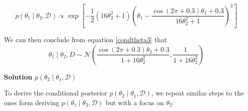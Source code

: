 \documentclass[12pt]{article}
\begin{document}
\begin{enumerate}
\begin{equation} \label{condtheta3}
p(\theta_1 \mid \theta_2, \mathcal{D}) \propto \exp\left[-\frac{1}{2}(16\theta_2^2 + 1)\left(\theta_1 - \frac{\cos(2\pi + 0.3)\theta_2 + 0.3}{16\theta_2^2 + 1}\right)^2\right]
\end{equation}

We can then conclude from equation \ref{condtheta3} that
\begin{equation}\label{condtheta4}
\theta_1 \mid \theta_2, D \sim \mathcal{N} \left( \frac{\cos(2\pi+0.3)\theta_2 + 0.3}{1 + 16\theta_2^2}, \frac{1}{1 + 16\theta_2^2} \right)
\end{equation}
\end{enumerate}



\textbf{Solution \(p(\theta_2 \mid \theta_1, \mathcal{D})\) }

To derive the conditional posterior \(p(\theta_2 \mid \theta_1, \mathcal{D})\), we repeat similar  steps to the ones form deriving  \(p(\theta_1 \mid \theta_2, \mathcal{D})\) but with a focus on $\theta_2$:
\end{document}
